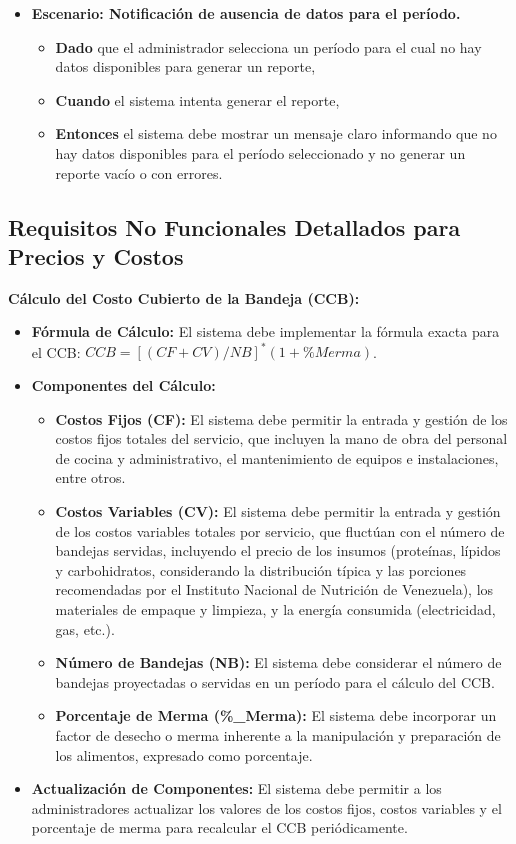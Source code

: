 \documentclass[12pt]{article}
\begin{document}
\begin{itemize}
	\item \textbf{Escenario: Notificación de ausencia de datos para el período.}
	\begin{itemize}
		\item \textbf{Dado} que el administrador selecciona un período para el cual no hay datos disponibles para generar un reporte,
		\item \textbf{Cuando} el sistema intenta generar el reporte,
		\item \textbf{Entonces} el sistema debe mostrar un mensaje claro informando que no hay datos disponibles para el período seleccionado y no generar un reporte vacío o con errores.
	\end{itemize}
\end{itemize}

\pagebreak

\subsection{Requisitos No Funcionales Detallados para Precios y Costos}

\textbf{Cálculo del Costo Cubierto de la Bandeja (CCB):}

\begin{itemize}
	\item \textbf{Fórmula de Cálculo:} El sistema debe implementar la fórmula exacta para el CCB: $CCB=[(CF+CV)/NB]^{*}(1+\%Merma)$.
	\item \textbf{Componentes del Cálculo:}
	\begin{itemize}
		\item \textbf{Costos Fijos (CF):} El sistema debe permitir la entrada y gestión de los costos fijos totales del servicio, que incluyen la mano de obra del personal de cocina y administrativo, el mantenimiento de equipos e instalaciones, entre otros.
		\item \textbf{Costos Variables (CV):} El sistema debe permitir la entrada y gestión de los costos variables totales por servicio, que fluctúan con el número de bandejas servidas, incluyendo el precio de los insumos (proteínas, lípidos y carbohidratos, considerando la distribución típica y las porciones recomendadas por el Instituto Nacional de Nutrición de Venezuela), los materiales de empaque y limpieza, y la energía consumida (electricidad, gas, etc.).
		\item \textbf{Número de Bandejas (NB):} El sistema debe considerar el número de bandejas proyectadas o servidas en un período para el cálculo del CCB.
		\item \textbf{Porcentaje de Merma (\%\_Merma):} El sistema debe incorporar un factor de desecho o merma inherente a la manipulación y preparación de los alimentos, expresado como porcentaje.
	\end{itemize}
	\item \textbf{Actualización de Componentes:} El sistema debe permitir a los administradores actualizar los valores de los costos fijos, costos variables y el porcentaje de merma para recalcular el CCB periódicamente.
\end{itemize}
\end{document}
